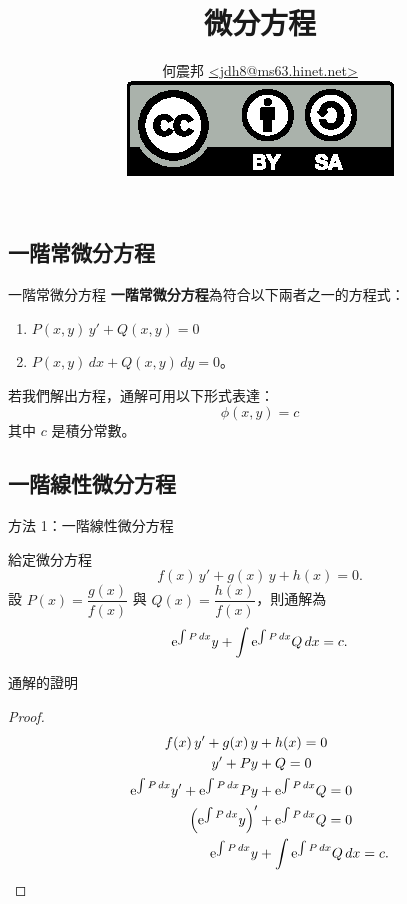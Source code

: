 \documentclass{beamer}
\title{微分方程}
\author[何震邦]{何震邦 \href{mailto:jdh8@ms63.hinet.net}{\textless jdh8@ms63.hinet.net\textgreater}\\
    \href{http://creativecommons.org/licenses/by-sa/3.0/tw/deed.zh\textunderscore TW}{\includegraphics{by-sa.eps}}}
\newcommand  {\e}{\textup e}
\theoremstyle{remark}
\begin{document}
\begin{CJK}{UTF8}{bsmi}
\maketitle

\section[一階 ODE]{一階常微分方程}
\begin{frame}{一階常微分方程}
  \textbf{一階常微分方程}為符合以下兩者之一的方程式：
  \begin{enumerate}
    \item $P(x,y)\,y' + Q(x,y) = 0$
    \item $P(x,y)\,dx + Q(x,y)\,dy = 0$。
  \end{enumerate}
  若我們解出方程，通解可用以下形式表達：
  \[\phi(x,y) = c\]
  其中 $c$ 是積分常數。
\end{frame}

\subsection[線性]{一階線性微分方程}
\begin{frame}{方法 1：一階線性微分方程}
  \begin{theorem}
    給定微分方程
    \[f(x)\,y' + g(x)\,y + h(x) = 0.\]
    設 $P(x) = \dfrac{g(x)}{f(x)}$ 與 $Q(x) = \dfrac{h(x)}{f(x)}$，則通解為
    \[\e^{\int P\,dx} y + \int \e^{\int P\,dx} Q\,dx = c.\]
  \end{theorem}
\end{frame}

\begin{frame}{通解的證明}
  \begin{proof}
    \begin{align*}
      f(x)\,y' + g(x)\,y &+ h(x) = 0\\
      y' + Py &+ Q = 0\\
      \e^{\int P\,dx} y' + \e^{\int P\,dx} Py &+ \e^{\int P\,dx} Q = 0\\
      \left( \e^{\int P\,dx} y \right)' &+ \e^{\int P\,dx} Q = 0\\
      \e^{\int P\,dx} y &+ \int \e^{\int P\,dx} Q\,dx = c. \qedhere
    \end{align*}
  \end{proof}
\end{frame}


\end{CJK}
\end{document}

